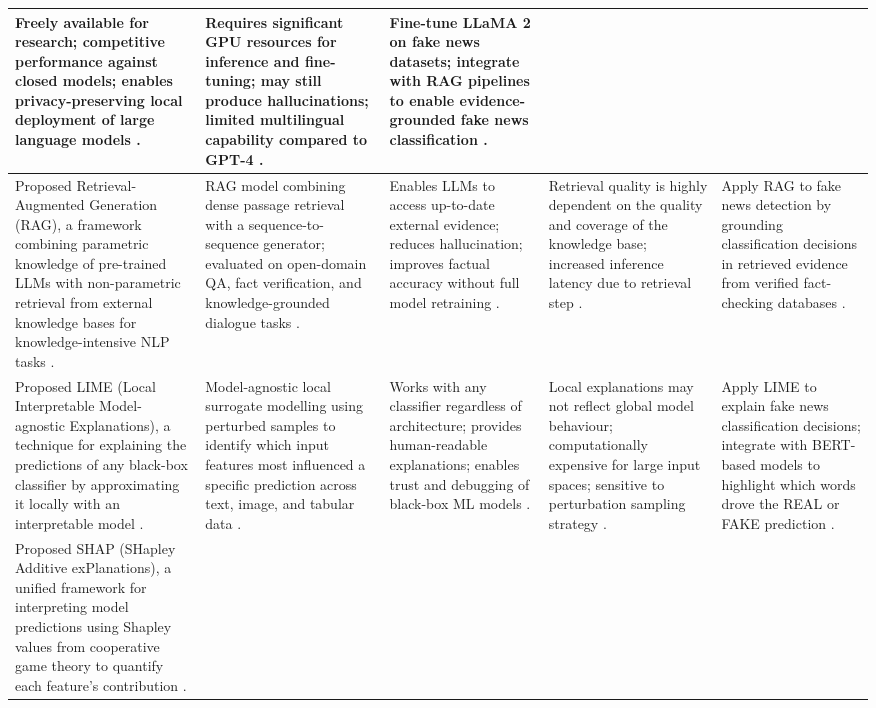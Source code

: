 \documentclass[runningheads]{llncs}
\begin{document}
\begin{longtable}{|p{}|p{}|p{}|p{}|p{}|}
Freely available for research; competitive performance against closed models; enables privacy-preserving local deployment of large language models \cite{Touvron2023Llama2}. &
Requires significant GPU resources for inference and fine-tuning; may still produce hallucinations; limited multilingual capability compared to GPT-4 \cite{Touvron2023Llama2}. &
Fine-tune LLaMA 2 on fake news datasets; integrate with RAG pipelines to enable evidence-grounded fake news classification \cite{Touvron2023Llama2}. \\ \hline
Proposed Retrieval-Augmented Generation (RAG), a framework combining parametric knowledge of pre-trained LLMs with non-parametric retrieval from external knowledge bases for knowledge-intensive NLP tasks \cite{Lewis2020RAG}. &
RAG model combining dense passage retrieval with a sequence-to-sequence generator; evaluated on open-domain QA, fact verification, and knowledge-grounded dialogue tasks \cite{Lewis2020RAG}. &
Enables LLMs to access up-to-date external evidence; reduces hallucination; improves factual accuracy without full model retraining \cite{Lewis2020RAG}. &
Retrieval quality is highly dependent on the quality and coverage of the knowledge base; increased inference latency due to retrieval step \cite{Lewis2020RAG}. &
Apply RAG to fake news detection by grounding classification decisions in retrieved evidence from verified fact-checking databases \cite{Lewis2020RAG}. \\ \hline
Proposed LIME (Local Interpretable Model-agnostic Explanations), a technique for explaining the predictions of any black-box classifier by approximating it locally with an interpretable model \cite{Ribeiro2016LIME}. &
Model-agnostic local surrogate modelling using perturbed samples to identify which input features most influenced a specific prediction across text, image, and tabular data \cite{Ribeiro2016LIME}. &
Works with any classifier regardless of architecture; provides human-readable explanations; enables trust and debugging of black-box ML models \cite{Ribeiro2016LIME}. &
Local explanations may not reflect global model behaviour; computationally expensive for large input spaces; sensitive to perturbation sampling strategy \cite{Ribeiro2016LIME}. &
Apply LIME to explain fake news classification decisions; integrate with BERT-based models to highlight which words drove the REAL or FAKE prediction \cite{Ribeiro2016LIME}. \\ \hline
Proposed SHAP (SHapley Additive exPlanations), a unified framework for interpreting model predictions using Shapley values from cooperative game theory to quantify each feature's contribution \cite{Lundberg2017SHAP}. &

\end{longtable}
\end{document}
